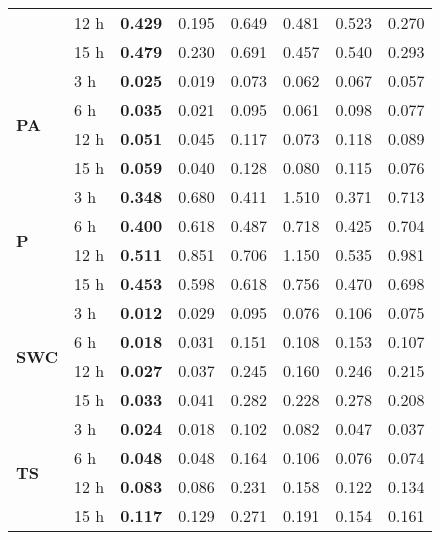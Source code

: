 \begin{table}
\begin{tabular}{p{2.1cm}l|rr|rr|rr}
 & 12 h & \bfseries 0.429 & 0.195 & 0.649 & 0.481 & 0.523 & 0.270 \\
 & 15 h & \bfseries 0.479 & 0.230 & 0.691 & 0.457 & 0.540 & 0.293 \\
\cline{1-8}
\multirow[c]{4}{*}{\textbf{PA}} & 3 h & \bfseries 0.025 & 0.019 & 0.073 & 0.062 & 0.067 & 0.057 \\
 & 6 h & \bfseries 0.035 & 0.021 & 0.095 & 0.061 & 0.098 & 0.077 \\
 & 12 h & \bfseries 0.051 & 0.045 & 0.117 & 0.073 & 0.118 & 0.089 \\
 & 15 h & \bfseries 0.059 & 0.040 & 0.128 & 0.080 & 0.115 & 0.076 \\
\cline{1-8}
\multirow[c]{4}{*}{\textbf{P}} & 3 h & \bfseries 0.348 & 0.680 & 0.411 & 1.510 & 0.371 & 0.713 \\
 & 6 h & \bfseries 0.400 & 0.618 & 0.487 & 0.718 & 0.425 & 0.704 \\
 & 12 h & \bfseries 0.511 & 0.851 & 0.706 & 1.150 & 0.535 & 0.981 \\
 & 15 h & \bfseries 0.453 & 0.598 & 0.618 & 0.756 & 0.470 & 0.698 \\
\cline{1-8}
\multirow[c]{4}{*}{\textbf{SWC}} & 3 h & \bfseries 0.012 & 0.029 & 0.095 & 0.076 & 0.106 & 0.075 \\
 & 6 h & \bfseries 0.018 & 0.031 & 0.151 & 0.108 & 0.153 & 0.107 \\
 & 12 h & \bfseries 0.027 & 0.037 & 0.245 & 0.160 & 0.246 & 0.215 \\
 & 15 h & \bfseries 0.033 & 0.041 & 0.282 & 0.228 & 0.278 & 0.208 \\
\cline{1-8}
\multirow[c]{4}{*}{\textbf{TS}} & 3 h & \bfseries 0.024 & 0.018 & 0.102 & 0.082 & 0.047 & 0.037 \\
 & 6 h & \bfseries 0.048 & 0.048 & 0.164 & 0.106 & 0.076 & 0.074 \\
 & 12 h & \bfseries 0.083 & 0.086 & 0.231 & 0.158 & 0.122 & 0.134 \\
 & 15 h & \bfseries 0.117 & 0.129 & 0.271 & 0.191 & 0.154 & 0.161 \\
\cline{1-8}
\bottomrule
\end{tabular}
\end{table}

